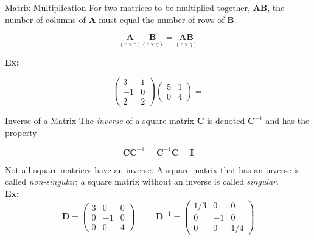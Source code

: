 \documentclass[11pt]{beamer}
\begin{document}
\begin{frame}{Matrix Multiplication}
\vspace{-1cm}
For two matrices to be multiplied together, $\bm{A}\bm{B}$, the number of columns of $\bm{A}$ must equal the number of rows of $\bm{B}$.

$$\underset{(r \times c)}{\bm{A}} \underset{(c \times q)}{\bm{B}}
= \underset{(r \times q)}{\bm{A}\bm{B}}$$

\textbf{Ex:}\\
\vspace{5pt}
\begin{fleqn}
\[
\begin{pmatrix}
3 & 1\\
-1 & 0\\
2 & 2
\end{pmatrix}
\begin{pmatrix}
5 & 1\\
0 & 4
\end{pmatrix}
=
\]
\end{fleqn}
\end{frame}

\begin{frame}
\end{frame}

\begin{frame}
\end{frame}

\begin{frame}{Inverse of a Matrix}
The \emph{inverse} of a square matrix $\bm{C}$ is denoted $\bm{C}^{-1}$ and has the property 

$$\bm{C}\bm{C}^{-1} = \bm{C}^{-1}\bm{C} = \bm{I}$$ 

Not all square matrices have an inverse.  A square matrix that has an inverse is called \emph{non-singular}; a square matrix without an inverse is called \emph{singular}.\\
\vspace{12pt}
\textbf{Ex:}
\[
\bm{D} =
\begin{pmatrix}
3 & 0 & 0\\
0 & -1 & 0\\
0 & 0 & 4
\end{pmatrix}
\hspace{1cm}
\bm{D}^{-1} =
\begin{pmatrix}
1/3 & 0 & 0\\
0 & -1 & 0\\
0 & 0 & 1/4
\end{pmatrix}
\]
\end{frame}
\end{document}
